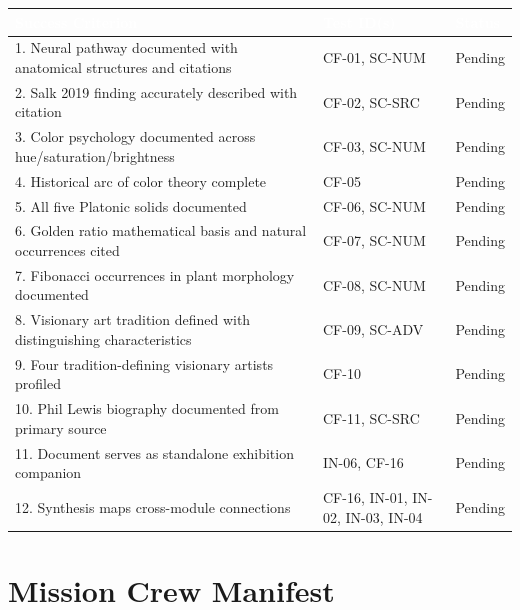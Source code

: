 \documentclass[11pt,letterpaper]{article}
\newcommand{\tableheader}[1]{\textbf{\sffamily\textcolor{white}{#1}}}
\begin{document}
\begin{center}
\begin{tabularx}{\textwidth}{XL{3.5cm}C{1.5cm}}
\toprule
{}
\tableheader{Success Criterion} & \tableheader{Test ID(s)} & \tableheader{Status} \\
. Neural pathway documented with anatomical structures and citations & CF-01, SC-NUM & Pending \\
2. Salk 2019 finding accurately described with citation & CF-02, SC-SRC & Pending \\
3. Color psychology documented across hue/saturation/brightness & CF-03, SC-NUM & Pending \\
4. Historical arc of color theory complete & CF-05 & Pending \\
5. All five Platonic solids documented & CF-06, SC-NUM & Pending \\
6. Golden ratio mathematical basis and natural occurrences cited & CF-07, SC-NUM & Pending \\
7. Fibonacci occurrences in plant morphology documented & CF-08, SC-NUM & Pending \\
8. Visionary art tradition defined with distinguishing characteristics & CF-09, SC-ADV & Pending \\
9. Four tradition-defining visionary artists profiled & CF-10 & Pending \\
10. Phil Lewis biography documented from primary source & CF-11, SC-SRC & Pending \\
11. Document serves as standalone exhibition companion & IN-06, CF-16 & Pending \\
12. Synthesis maps cross-module connections & CF-16, IN-01, IN-02, IN-03, IN-04 & Pending \\
\bottomrule
\end{tabularx}
\end{center}

\newpage

\section{Mission Crew Manifest}
\end{document}
